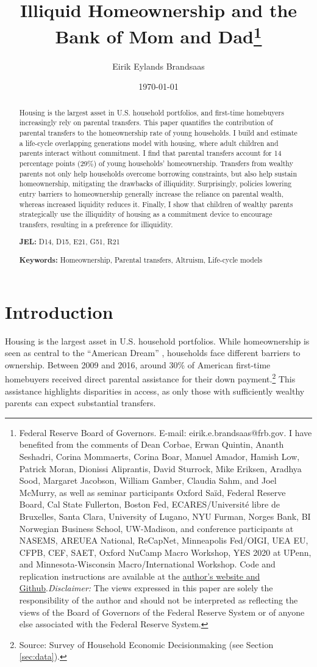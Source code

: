 \documentclass[12pt]{article}
\title{{\LARGE Illiquid Homeownership and the \\ Bank of Mom and Dad}\thanks{Federal Reserve Board of Governors. E-mail: eirik.e.brandsaas@frb.gov. I have benefited from the comments of Dean Corbae, Erwan Quintin, Ananth Seshadri, Corina Mommaerts, Corina Boar, Manuel Amador, Hamish Low, Patrick Moran, Dionissi Aliprantis, David Sturrock, Mike Eriksen, Aradhya Sood, Margaret Jacobson, William Gamber, Claudia Sahm, and Joel McMurry, as well as seminar participants Oxford Sa{\"i}d, Federal Reserve Board, Cal State Fullerton, Boston Fed, ECARES/Université libre de Bruxelles, Santa Clara, University of Lugano, NYU Furman, Norges Bank, BI Norwegian Business School, UW-Madison, and conference participants at NASEMS, AREUEA National, ReCapNet, Minneapolis Fed/OIGI, UEA EU, CFPB, CEF, SAET, Oxford NuCamp Macro Workshop, YES 2020 at UPenn, and Minnesota-Wisconsin Macro/International Workshop. Code and replication instructions are available at the \href{https://github.com/eirikbrandsaas/HomeownershipBankMomDad.jl}{author's  website and Github}.\newline \textit{Disclaimer: }The views expressed in this paper are solely the responsibility of the author and should not be interpreted as reflecting the views of the Board of Governors of the Federal Reserve System or of anyone else associated with the Federal Reserve System.}}
\author{Eirik Eylands Brandsaas}
\date{{\today }}
\begin{document}
\maketitle
\begin{abstract}
{\begin{spacing}{1.2}
Housing is the largest asset in U.S. household portfolios, and first-time homebuyers increasingly rely on parental transfers. This paper quantifies the contribution of parental transfers to the homeownership rate of young households. I build and estimate a life-cycle overlapping generations model with housing, where adult children and parents interact without commitment. I find that parental transfers account for 14 percentage points (29\%) of young households' homeownership. Transfers from wealthy parents not only help households overcome borrowing constraints, but also help sustain homeownership, mitigating the drawbacks of illiquidity. Surprisingly, policies lowering entry barriers to homeownership generally increase the reliance on parental wealth, whereas increased liquidity reduces it. Finally, I show that children of wealthy parents strategically use the illiquidity of housing as a commitment device to encourage transfers, resulting in a preference for illiquidity.
\end{spacing}}
\vspace{0.5cm}
\noindent \textbf{JEL:} D14, D15, E21, G51, R21

\noindent \textbf{Keywords:} Homeownership, Parental transfers, Altruism, Life-cycle models

\end{abstract}
\newpage
\onehalfspacing

\section{Introduction}
Housing is the largest asset in U.S. household portfolios. While homeownership is seen as central to the ``American Dream'' \citep{goodman2018homeownership}, households face different barriers to ownership. Between 2009 and 2016, around 30\% of American first-time homebuyers received direct parental assistance for their down payment.\footnote{Source: Survey of Household Economic Decisionmaking (see Section \ref{sec:data}).} This assistance highlights disparities in access, as only those with sufficiently wealthy parents can expect substantial transfers.
\end{document}
